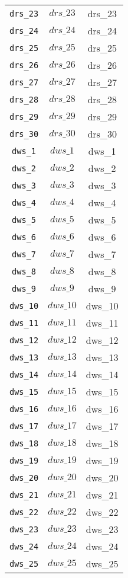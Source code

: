 \begin{center}
\begin{longtable}{ccc}
\texttt{drs\_23} & $drs\_23$ & drs\_23\\
\texttt{drs\_24} & $drs\_24$ & drs\_24\\
\texttt{drs\_25} & $drs\_25$ & drs\_25\\
\texttt{drs\_26} & $drs\_26$ & drs\_26\\
\texttt{drs\_27} & $drs\_27$ & drs\_27\\
\texttt{drs\_28} & $drs\_28$ & drs\_28\\
\texttt{drs\_29} & $drs\_29$ & drs\_29\\
\texttt{drs\_30} & $drs\_30$ & drs\_30\\
\texttt{dws\_1} & $dws\_1$ & dws\_1\\
\texttt{dws\_2} & $dws\_2$ & dws\_2\\
\texttt{dws\_3} & $dws\_3$ & dws\_3\\
\texttt{dws\_4} & $dws\_4$ & dws\_4\\
\texttt{dws\_5} & $dws\_5$ & dws\_5\\
\texttt{dws\_6} & $dws\_6$ & dws\_6\\
\texttt{dws\_7} & $dws\_7$ & dws\_7\\
\texttt{dws\_8} & $dws\_8$ & dws\_8\\
\texttt{dws\_9} & $dws\_9$ & dws\_9\\
\texttt{dws\_10} & $dws\_10$ & dws\_10\\
\texttt{dws\_11} & $dws\_11$ & dws\_11\\
\texttt{dws\_12} & $dws\_12$ & dws\_12\\
\texttt{dws\_13} & $dws\_13$ & dws\_13\\
\texttt{dws\_14} & $dws\_14$ & dws\_14\\
\texttt{dws\_15} & $dws\_15$ & dws\_15\\
\texttt{dws\_16} & $dws\_16$ & dws\_16\\
\texttt{dws\_17} & $dws\_17$ & dws\_17\\
\texttt{dws\_18} & $dws\_18$ & dws\_18\\
\texttt{dws\_19} & $dws\_19$ & dws\_19\\
\texttt{dws\_20} & $dws\_20$ & dws\_20\\
\texttt{dws\_21} & $dws\_21$ & dws\_21\\
\texttt{dws\_22} & $dws\_22$ & dws\_22\\
\texttt{dws\_23} & $dws\_23$ & dws\_23\\
\texttt{dws\_24} & $dws\_24$ & dws\_24\\
\texttt{dws\_25} & $dws\_25$ & dws\_25\\

\end{longtable}
\end{center}

